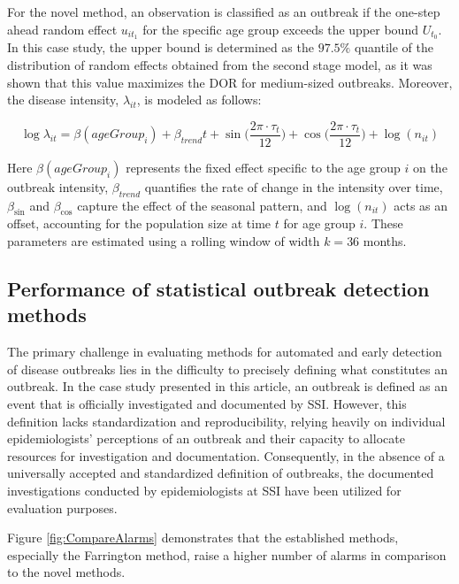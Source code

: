 \documentclass[preprint, 3p, authoryear]{elsarticle} %
\begin{document}
For the novel method, an observation is classified as an outbreak if the one-step ahead random effect \(u_{it_1}\) for the specific age group exceeds the upper bound \(U_{t_0}\). In this case study, the upper bound is determined as the \(97.5\%\) quantile of the distribution of random effects obtained from the second stage model, as it was shown that this value maximizes the DOR for medium-sized outbreaks. Moreover, the disease intensity, \(\lambda_{it}\), is modeled as follows:

\begin{equation}
  \log{\lambda_{it}}=\beta(ageGroup_i) + \beta_{trend} t + \sin\big(\frac{2\pi\cdot\tau_t}{12}\big) + \cos \big(\frac{2\pi\cdot\tau_t}{12}\big) + \log(n_{it})
\end{equation}

Here \(\beta(ageGroup_i)\) represents the fixed effect specific to the age group \(i\) on the outbreak intensity, \(\beta_{trend}\) quantifies the rate of change in the intensity over time, \(\beta_{\sin}\) and \(\beta_{\cos}\) capture the effect of the seasonal pattern, and \(\log(n_{it})\) acts as an offset, accounting for the population size at time \(t\) for age group \(i\). These parameters are estimated using a rolling window of width \(k=36\) months.

\hypertarget{performance-of-statistical-outbreak-detection-methods}{%
\subsection{Performance of statistical outbreak detection methods}\label{performance-of-statistical-outbreak-detection-methods}}

The primary challenge in evaluating methods for automated and early detection of disease outbreaks lies in the difficulty to precisely defining what constitutes an outbreak. In the case study presented in this article, an outbreak is defined as an event that is officially investigated and documented by SSI. However, this definition lacks standardization and reproducibility, relying heavily on individual epidemiologists' perceptions of an outbreak and their capacity to allocate resources for investigation and documentation. Consequently, in the absence of a universally accepted and standardized definition of outbreaks, the documented investigations conducted by epidemiologists at SSI have been utilized for evaluation purposes.

Figure \ref{fig:CompareAlarms} demonstrates that the established methods, especially the Farrington method, raise a higher number of alarms in comparison to the novel methods.
\end{document}
